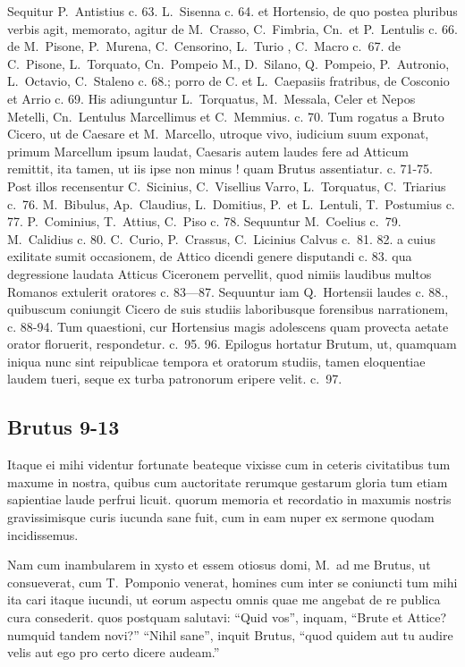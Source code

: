 Sequitur P.~Antistius c. 63. L.~Sisenna c. 64. et Hortensio, de quo postea pluribus verbis agit, memorato, agitur de M.~Crasso, C.~Fimbria, Cn.~et P.~Lentulis c. 66. de M.~Pisone, P.~Murena, C.~Censorino, L.~Turio , C.~Macro c.~67. de C.~Pisone, L.~Torquato, Cn.~Pompeio M., D.~Silano, Q.~Pompeio, P.~Autronio, L.~Octavio, C.~Staleno c. 68.; porro de C. et L.~Caepasiis fratribus, de Cosconio et Arrio c. 69. His adiunguntur L.~Torquatus, M.~Messala, Celer et Nepos Metelli, Cn.~Lentulus Marcellimus et C.~Memmius. c. 70. Tum rogatus a Bruto Cicero, ut de Caesare et M.~Marcello, utroque vivo, iudicium suum exponat, primum Marcellum ipsum laudat, Caesaris autem laudes fere ad Atticum remittit, ita tamen, ut iis ipse non minus ! quam Brutus assentiatur. c. 71-75. Post illos recensentur C.~Sicinius, C.~Visellius Varro, L.~Torquatus, C.~Triarius c.~76. M.~Bibulus, Ap.~Claudius, L.~Domitius, P.~et L.~Lentuli, T.~Postumius c. 77. P.~Cominius, T.~Attius, C.~Piso c. 78. Sequuntur M.~Coelius c.\ 79. M.~Calidius c. 80. C.~Curio, P.~Crassus, C.~Licinius Calvus c.\ 81. 82. a cuius exilitate sumit occasionem, de Attico dicendi genere disputandi c. 83. qua degressione laudata Atticus Ciceronem pervellit, quod nimiis laudibus multos Romanos extulerit oratores c. 83—87. Sequuntur iam Q.~Hortensii laudes c. 88., quibuscum coniungit Cicero de suis studiis laboribusque forensibus narrationem, c. 88-94. Tum quaestioni, cur Hortensius magis adolescens quam provecta aetate orator floruerit, respondetur. c.\ 95. 96. Epilogus hortatur Brutum, ut, quamquam iniqua nunc sint reipublicae tempora et oratorum studiis, tamen eloquentiae laudem tueri, seque ex turba patronorum eripere velit. c.\ 97.

\subsection*{Brutus 9-13}

Itaque ei mihi videntur fortunate beateque vixisse cum in ceteris civitatibus tum maxume in nostra, quibus cum auctoritate rerumque gestarum gloria tum etiam sapientiae laude perfrui licuit. quorum memoria et recordatio in maxumis nostris gravissimisque curis iucunda sane fuit, cum in eam nuper ex sermone quodam incidissemus.

Nam cum inambularem in xysto et essem otiosus domi, M.\ ad me Brutus, ut consueverat, cum T.~Pomponio venerat, homines cum inter se coniuncti tum mihi ita cari itaque iucundi, ut eorum aspectu omnis quae me angebat de re publica cura consederit. quos postquam salutavi: ``Quid vos'', inquam, ``Brute et Attice? numquid tandem novi?'' ``Nihil sane'', inquit Brutus, ``quod quidem aut tu audire velis aut ego pro certo dicere audeam.''

